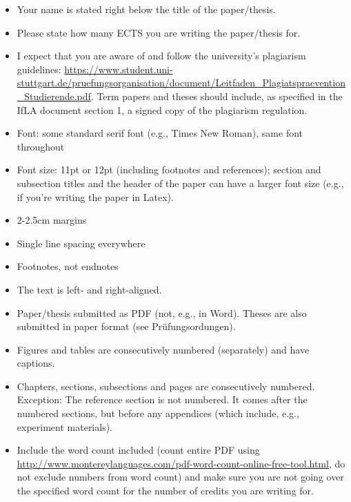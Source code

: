 \documentclass[11pt,fleqn,a4paper/thesis]{article}
\newcommand{\6}{\mbox{$[\hspace*{-.6mm}[$}}
\newcommand{\9}{\mbox{$]\hspace*{-.6mm}]$}}
\begin{document}
\begin{itemize}[itemsep=-1pt,leftmargin=2.5ex,topsep=-2pt]

\item Your name is stated right below the title of the paper/thesis. 

\item Please state how many ECTS you are writing the paper/thesis for.

\item I expect that you are aware of and follow the university's plagiarism guidelines: \url{https://www.student.uni-stuttgart.de/pruefungsorganisation/document/Leitfaden_Plagiatspraevention_Studierende.pdf}. Term papers and theses should include, as specified in the IfLA document section 1, a signed copy of the plagiarism regulation. 

\item Font: some standard serif font (e.g., Times New Roman), same font throughout

\item Font size: 11pt or 12pt (including footnotes and references); section and subsection titles and the header of the paper can have a larger font size (e.g., if you're writing the paper in Latex).

\item 2-2.5cm margins 

\item Single line spacing everywhere

\item Footnotes, not endnotes

\item The text is left- and right-aligned.

\item Paper/thesis submitted as PDF (not, e.g., in Word). Theses are also submitted in paper format (see Pr\"ufungsordungen).

\item Figures and tables are consecutively numbered (separately) and have captions.

\item Chapters, sections, subsections and pages are consecutively numbered. Exception: The reference section is not numbered. It comes after the numbered sections, but before any appendices (which include, e.g., experiment materials).

\item Include the word count included (count entire PDF using \url{http://www.montereylanguages.com/pdf-word-count-online-free-tool.html}, do not exclude numbers from word count) and make sure you are not going over the specified word count for the number of credits you are writing for.


\end{itemize}
\end{document}
